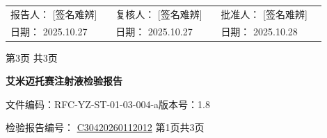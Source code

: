 \documentclass[UTF8,10pt,a4paper,fontset=fandol]{ctexart}
\newcommand{\fieldvalue}[1]{#1}
\newcommand{\handwritten}[1]{#1}
\begin{document}
\begin{tabular}{p{0.30\linewidth}p{0.30\linewidth}p{0.30\linewidth}}
报告人：
\fieldvalue{\handwritten{[签名难辨]}}
&
复核人：
\fieldvalue{\handwritten{[签名难辨]}}
&
批准人：
\fieldvalue{\handwritten{[签名难辨]}}
\\[1.5em]
日期：
\fieldvalue{\handwritten{2025.10.27}}
&
日期：
\fieldvalue{\handwritten{2025.10.27}}
&
日期：
\fieldvalue{\handwritten{2025.10.28}}
\end{tabular}

\begin{center}
第3页 共3页
\end{center}

\newpage

\begin{center}
{\small
\textbf{艾米迈托赛注射液检验报告}
}
\end{center}

\noindent
文件编码：RFC-YZ-ST-01-03-004-a\hfill 版本号：1.8

\noindent
检验报告编号：
\fieldvalue{\underline{C30420260112012}} \quad 第1页共3页
\end{document}
